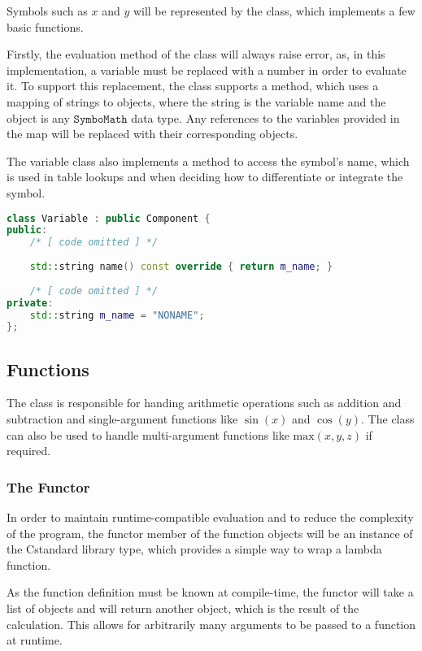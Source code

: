 \documentclass[12pt]{article}
\def\CC{{C\nolinebreak[4]\hspace{-.05em}\raisebox{.4ex}{\tiny\bf ++ }}}
\def\Symbo{{$\texttt{SymboMath}$}}
\begin{document}
Symbols such as $x$ and $y$ will be represented by the  class, which implements a few basic functions.

Firstly, the evaluation method of the class will always raise error, as, in this implementation, a variable must be replaced with a number in order to evaluate it. To support this replacement, the class supports a  method, which uses a mapping of strings to objects, where the string is the variable name and the object is any \Symbo{} data type. Any references to the variables provided in the map will be replaced with their corresponding objects.

The variable class also implements a method to access the symbol's name, which is used in table lookups and when deciding how to differentiate or integrate the symbol.

\begin{lstlisting}[language=C++]
class Variable : public Component {
public:
	/* [ code omitted ] */
	
	std::string name() const override { return m_name; }
	
	/* [ code omitted ] */
private:
	std::string m_name = "NONAME";
};
\end{lstlisting}

\subsection{Functions}

The  class is responsible for handing arithmetic operations such as addition and subtraction and single-argument functions like $\sin(x)$ and $\cos(y)$. The class can also be used to handle multi-argument functions like $\text{max}(x, y, z)$ if required.

\subsubsection{The Functor}

In order to maintain runtime-compatible evaluation and to reduce the complexity of the program, the functor member of the function objects will be an instance of the \CC standard library  type, which provides a simple way to wrap a lambda function.

As the function definition must be known at compile-time, the functor will take a list of  objects and will return another  object, which is the result of the calculation. This allows for arbitrarily many arguments to be passed to a function at runtime.
\end{document}
